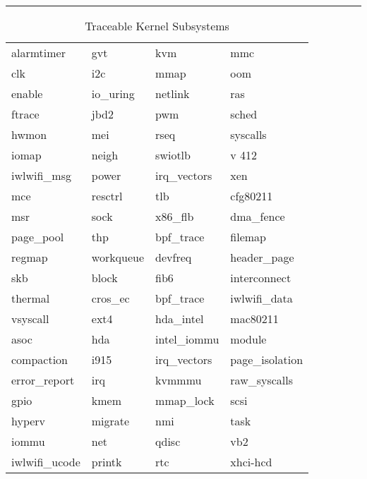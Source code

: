 \documentclass{report}
\begin{document}
\begin{spacing}{1.5}
{\large
\noindent\rule{15.5cm}{0.4pt}
\begin{longtable}{llll}
\caption{Traceable Kernel Subsystems} \\
alarmtimer                  & gvt              & kvm              & mmc \\
clk                         & i2c              & mmap             & oom \\ 
enable                      & io\_uring         & netlink          & ras \\
ftrace                      & jbd2             & pwm              & sched \\
hwmon                       & mei              & rseq             & syscalls \\
iomap                       & neigh            & swiotlb          & v 412 \\
iwlwifi\_msg                 & power            & irq\_vectors      & xen \\
mce                         & resctrl          & tlb              & cfg80211 \\
msr                         & sock             & x86\_flb          & dma\_fence \\
page\_pool                   & thp              & bpf\_trace        & filemap \\
regmap                      & workqueue        & devfreq          & header\_page \\
skb                         & block            & fib6             & interconnect \\
thermal                     & cros\_ec          & bpf\_trace        & iwlwifi\_data \\
vsyscall                    & ext4             & hda\_intel        & mac80211 \\
asoc                        & hda              & intel\_iommu      & module \\
compaction                  & i915             & irq\_vectors      & page\_isolation \\
error\_report                & irq              & kvmmmu           & raw\_syscalls \\
gpio                        & kmem             & mmap\_lock        & scsi \\
hyperv                      & migrate          & nmi              & task \\
iommu                       & net              & qdisc            & vb2 \\
iwlwifi\_ucode               & printk           & rtc              & xhci-hcd \\

\end{longtable}}
\end{spacing}
\end{document}
